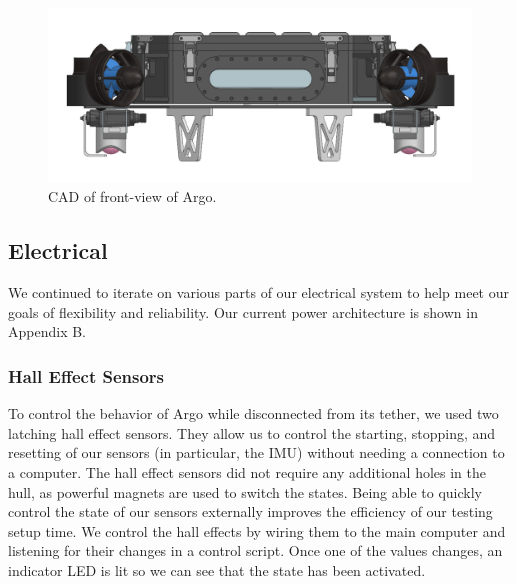 \documentclass[conference]{IEEEtran}
\begin{document}
\begin{figure}[h]
    \centerline{\includegraphics[scale=0.35]{images/Front_no foam.PNG}}
    \caption{CAD of front-view of Argo.}
    \label{fig:sub6}
\end{figure}

\subsection{Electrical}
\label{ssec:electrical}
We continued to iterate on various parts of our electrical system to help meet our goals of flexibility and reliability. Our current power architecture is shown in Appendix B.

\break

\subsubsection{Hall Effect Sensors}
\label{sssec:hall_effects}
To control the behavior of Argo while disconnected from its tether, we used two latching hall effect sensors. They allow us to control the starting, stopping, and resetting of our sensors (in particular, the IMU) without needing a connection to a computer. The hall effect sensors did not require any additional holes in the hull, as powerful magnets are used to switch the states. Being able to quickly control the state of our sensors externally improves the efficiency of our testing setup time. We control the hall effects by wiring them to the main computer and listening for their changes in a control script. Once one of the values changes, an indicator LED is lit so we can see that the state has been activated.
\end{document}
